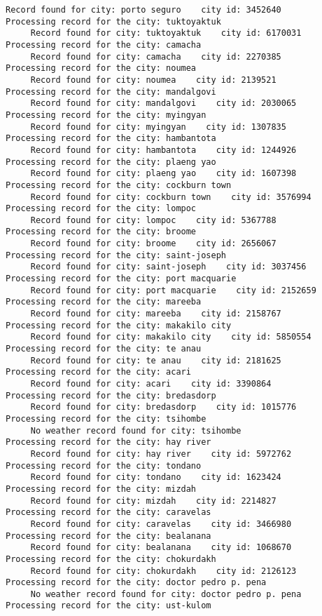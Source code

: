 \documentclass[11pt]{article}
\begin{document}
\begin{Verbatim}[commandchars=\\\{\}]
     Record found for city: porto seguro    city id: 3452640
Processing record for the city: tuktoyaktuk
     Record found for city: tuktoyaktuk    city id: 6170031
Processing record for the city: camacha
     Record found for city: camacha    city id: 2270385
Processing record for the city: noumea
     Record found for city: noumea    city id: 2139521
Processing record for the city: mandalgovi
     Record found for city: mandalgovi    city id: 2030065
Processing record for the city: myingyan
     Record found for city: myingyan    city id: 1307835
Processing record for the city: hambantota
     Record found for city: hambantota    city id: 1244926
Processing record for the city: plaeng yao
     Record found for city: plaeng yao    city id: 1607398
Processing record for the city: cockburn town
     Record found for city: cockburn town    city id: 3576994
Processing record for the city: lompoc
     Record found for city: lompoc    city id: 5367788
Processing record for the city: broome
     Record found for city: broome    city id: 2656067
Processing record for the city: saint-joseph
     Record found for city: saint-joseph    city id: 3037456
Processing record for the city: port macquarie
     Record found for city: port macquarie    city id: 2152659
Processing record for the city: mareeba
     Record found for city: mareeba    city id: 2158767
Processing record for the city: makakilo city
     Record found for city: makakilo city    city id: 5850554
Processing record for the city: te anau
     Record found for city: te anau    city id: 2181625
Processing record for the city: acari
     Record found for city: acari    city id: 3390864
Processing record for the city: bredasdorp
     Record found for city: bredasdorp    city id: 1015776
Processing record for the city: tsihombe
     No weather record found for city: tsihombe
Processing record for the city: hay river
     Record found for city: hay river    city id: 5972762
Processing record for the city: tondano
     Record found for city: tondano    city id: 1623424
Processing record for the city: mizdah
     Record found for city: mizdah    city id: 2214827
Processing record for the city: caravelas
     Record found for city: caravelas    city id: 3466980
Processing record for the city: bealanana
     Record found for city: bealanana    city id: 1068670
Processing record for the city: chokurdakh
     Record found for city: chokurdakh    city id: 2126123
Processing record for the city: doctor pedro p. pena
     No weather record found for city: doctor pedro p. pena
Processing record for the city: ust-kulom

\end{Verbatim}
\end{document}
